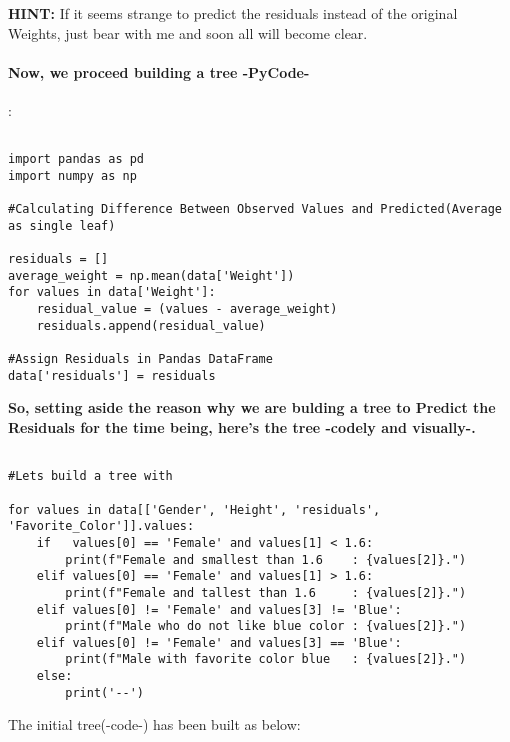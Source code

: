 \documentclass[12pt, a4paper]{article} %
\begin{document}
\textbf{HINT:} If it seems strange to predict the residuals instead of the original Weights, just bear with me and soon all will become clear.

\paragraph{Now, we proceed building a tree -PyCode-}:



\begin{lstlisting}

import pandas as pd
import numpy as np

#Calculating Difference Between Observed Values and Predicted(Average as single leaf)

residuals = []
average_weight = np.mean(data['Weight'])
for values in data['Weight']:
    residual_value = (values - average_weight)
    residuals.append(residual_value)
    
#Assign Residuals in Pandas DataFrame
data['residuals'] = residuals
\end{lstlisting}



\textbf{So, setting aside the reason why we are bulding a tree to Predict the Residuals for the time being, here's the tree -codely and visually-.}


\begin{lstlisting}

#Lets build a tree with

for values in data[['Gender', 'Height', 'residuals', 'Favorite_Color']].values:
    if   values[0] == 'Female' and values[1] < 1.6:
        print(f"Female and smallest than 1.6    : {values[2]}.")
    elif values[0] == 'Female' and values[1] > 1.6:
        print(f"Female and tallest than 1.6     : {values[2]}.")
    elif values[0] != 'Female' and values[3] != 'Blue':
        print(f"Male who do not like blue color : {values[2]}.")
    elif values[0] != 'Female' and values[3] == 'Blue':
        print(f"Male with favorite color blue   : {values[2]}.")
    else:
        print('--')

\end{lstlisting}


 The initial tree(-code-) has been built as below:
 
\end{document}
